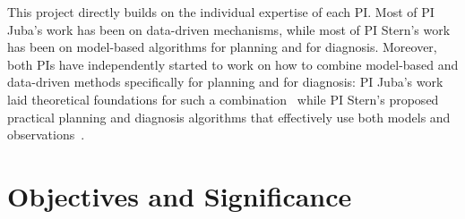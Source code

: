 \documentclass[12pt]{article}
\begin{document}


This project directly builds on the individual expertise of each PI. Most of PI Juba's work has been on data-driven mechanisms, while most of PI Stern's work has been on model-based algorithms for planning and for diagnosis. Moreover, both PIs have independently started to work on how to combine model-based and data-driven methods specifically for planning and for diagnosis: PI Juba's work laid theoretical foundations for such a combination~\cite{juba2016aaai,juba2016jmlr} while PI Stern's proposed practical planning and diagnosis algorithms that effectively use both models and observations~\cite{elmishali2016dataAugmented,stern2011probably,stern2012search}.

 
 

\section{Objectives and Significance}
\end{document}
